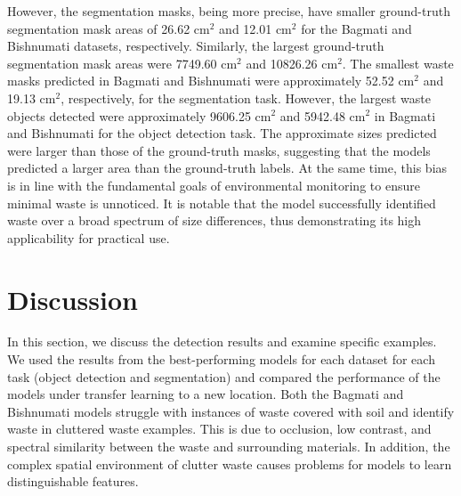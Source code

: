 \documentclass{ieeeaccess}
\begin{document}
However, the segmentation masks, being more precise, have smaller ground-truth segmentation mask areas of 26.62 $\text{cm}^2$ and 12.01 $\text{cm}^2$ for the Bagmati and Bishnumati datasets, respectively. Similarly, the largest ground-truth segmentation mask areas were 7749.60 $\text{cm}^2$ and 10826.26 $\text{cm}^2$. The smallest waste masks predicted in Bagmati and Bishnumati were approximately 52.52 $\text{cm}^2$ and 19.13 $\text{cm}^2$, respectively, for the segmentation task. However, the largest waste objects detected were approximately 9606.25 $\text{cm}^2$ and 5942.48 $\text{cm}^2$ in Bagmati and Bishnumati for the object detection task. The approximate sizes predicted were larger than those of the ground-truth masks, suggesting that the models predicted a larger area than the ground-truth labels. At the same time, this bias is in line with the fundamental goals of environmental monitoring to ensure minimal waste is unnoticed. It is notable that the model successfully identified waste over a broad spectrum of size differences, thus demonstrating its high applicability for practical use.

\section{Discussion}
\label{sec:discussion}
In this section, we discuss the detection results and examine specific examples. We used the results from the best-performing models for each dataset for each task (object detection and segmentation) and compared the performance of the models under transfer learning to a new location. Both the Bagmati and Bishnumati models struggle with instances of waste covered with soil and identify waste in cluttered waste examples. This is due to occlusion, low contrast, and spectral similarity between the waste and surrounding materials. 
In addition, the complex spatial environment of clutter waste causes problems for models to learn distinguishable features.
\end{document}
